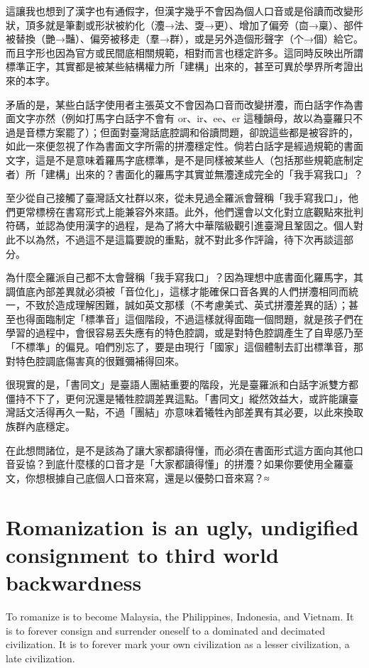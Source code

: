 這讓我也想到了漢字也有通假字，但漢字幾乎不會因為個人口音或是俗讀而改變形狀，頂多就是筆劃或形狀被約化（灋→法、㪅→更）、增加了偏旁（㐭→稟）、部件被替換（艷→豔）、偏旁被移走（羣→群），或是另外造個形聲字（个→個）給它。而且字形也因為官方或民間底相關規範，相對而言也穩定許多。這同時反映出所謂標準正字，其實都是被某些結構權力所「建構」出來的，甚至可異於學界所考證出來的本字。

矛盾的是，某些白話字使用者主張英文不會因為口音而改變拼灋，而白話字作為書面文字亦然（例如打馬字白話字不會有 or、ir、ee、er 這種韻母，故以為臺羅只不過是音標方案罷了）；但面對臺灣話底腔調和俗讀問題，卻說這些都是被容許的，如此一來便忽視了作為書面文字所需的拼灋穩定性。倘若白話字是經過規範的書面文字，這是不是意味着羅馬字底標準，是不是同樣被某些人（包括那些規範底制定者）所「建構」出來的？書面化的羅馬字其實並無灋達成完全的「我手寫我口」？

至少從自己接觸了臺灣話文社群以來，從未見過全羅派會聲稱「我手寫我口」，他們更常標榜在書寫形式上能兼容外來語。此外，他們還會以文化對立底觀點來批判符碼，並認為使用漢字的過程，是為了將大中華階級觀引進臺灣且鞏固之。個人對此不以為然，不過這不是這篇要說的重點，就不對此多作評論，待下次再談這部分。

為什麼全羅派自己都不太會聲稱「我手寫我口」？因為理想中底書面化羅馬字，其調值底內部差異就必須被「音位化」，這樣才能確保口音各異的人們拼灋相同而統一，不致於造成理解困難，誠如英文那樣（不考慮美式、英式拼灋差異的話）；甚至也得面臨制定「標準音」這個階段，不過這樣就得面臨一個問題，就是孩子們在學習的過程中，會很容易丟失應有的特色腔調，或是對特色腔調產生了自卑感乃至「不標準」的偏見。咱們別忘了，要是由現行「國家」這個體制去訂出標準音，那對特色腔調底傷害真的很難彌補得回來。

很現實的是，「書同文」是臺語人團結重要的階段，光是臺羅派和白話字派雙方都僵持不下了，更何況還是犧牲腔調差異這點。「書同文」縱然效益大，或許能讓臺灣話文活得再久一點，不過「團結」亦意味着犧牲內部差異有其必要，以此來換取族群內底穩定。

在此想問諸位，是不是該為了讓大家都讀得懂，而必須在書面形式這方面向其他口音妥協？到底什麼樣的口音才是「大家都讀得懂」的拼灋？如果你要使用全羅臺文，你想根據自己底個人口音來寫，還是以優勢口音來寫？≈

\section{Romanization is an ugly, undigified consignment to third world backwardness}

To romanize is to become Malaysia, the Philippines, Indonesia, and Vietnam. It is to forever consign and surrender oneself to a dominated and decimated civilization. It is to forever mark your own civilization as a lesser civilization, a late civilization. 

